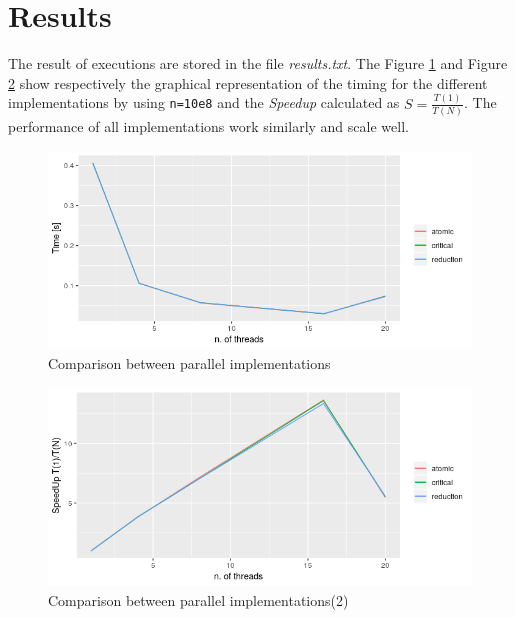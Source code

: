 \documentclass[]{scrartcl}
\begin{document}
 \section{Results}
 The result of executions are stored in the file \textit{results.txt}.
 The Figure \ref{fig_1} and Figure \ref{fig_2} show respectively the graphical representation of the timing for the different implementations by using \texttt{n=10e8} and the \textit{Speedup} calculated as $S = \frac{T(1)}{T(N)}$. The performance of all implementations work similarly and scale well.
\begin{figure}[h!]
	\begin{centering}
		\includegraphics[scale=.8]{correct_final}
		\caption{Comparison between parallel implementations}
		\label{fig_1}
	\end{centering}
\end{figure}

\begin{figure}[h!]
	\begin{centering}
		\includegraphics[scale=.8]{speedup}
		\caption{Comparison between parallel implementations(2)}
		\label{fig_2}
	\end{centering}
\end{figure}
\end{document}

